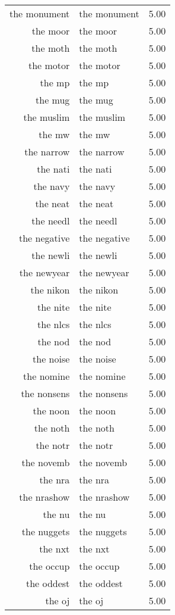 \begin{table}[ht]
\begin{tabular}{rlr}
  the monument & the monument & 5.00 \\ 
  the moor & the moor & 5.00 \\ 
  the moth & the moth & 5.00 \\ 
  the motor & the motor & 5.00 \\ 
  the mp & the mp & 5.00 \\ 
  the mug & the mug & 5.00 \\ 
  the muslim & the muslim & 5.00 \\ 
  the mw & the mw & 5.00 \\ 
  the narrow & the narrow & 5.00 \\ 
  the nati & the nati & 5.00 \\ 
  the navy & the navy & 5.00 \\ 
  the neat & the neat & 5.00 \\ 
  the needl & the needl & 5.00 \\ 
  the negative & the negative & 5.00 \\ 
  the newli & the newli & 5.00 \\ 
  the newyear & the newyear & 5.00 \\ 
  the nikon & the nikon & 5.00 \\ 
  the nite & the nite & 5.00 \\ 
  the nlcs & the nlcs & 5.00 \\ 
  the nod & the nod & 5.00 \\ 
  the noise & the noise & 5.00 \\ 
  the nomine & the nomine & 5.00 \\ 
  the nonsens & the nonsens & 5.00 \\ 
  the noon & the noon & 5.00 \\ 
  the noth & the noth & 5.00 \\ 
  the notr & the notr & 5.00 \\ 
  the novemb & the novemb & 5.00 \\ 
  the nra & the nra & 5.00 \\ 
  the nrashow & the nrashow & 5.00 \\ 
  the nu & the nu & 5.00 \\ 
  the nuggets & the nuggets & 5.00 \\ 
  the nxt & the nxt & 5.00 \\ 
  the occup & the occup & 5.00 \\ 
  the oddest & the oddest & 5.00 \\ 
  the oj & the oj & 5.00 \\ 

\end{tabular}
\end{table}
